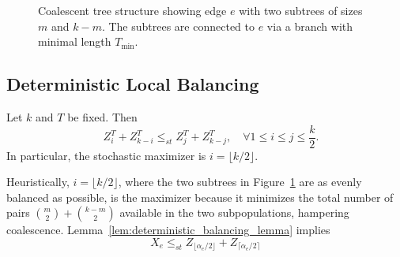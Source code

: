 \begin{figure}[t!]
\centering
{}
\caption{Coalescent tree structure showing edge $e$ with two subtrees of sizes $m$ and $k-m$. The subtrees are connected to $e$ via a branch with minimal length $T_{\mathrm{min}}$.}
\label{fig:coalescent_tree}
\end{figure}


\subsection{Deterministic Local Balancing}
\label{sec:deterministic-local-balancing}

\begin{lemma}
\label{lem:deterministic_balancing_lemma} Let $k$ and $T$ be fixed. Then
    \[\quad Z^T_{i} + Z^T_{k-i} \leq_{st}  Z^T_{j} + Z^T_{k-j}, \quad\forall 1 \leq i \leq j \leq \frac{k}{2}.\]
    \noindent In particular, the stochastic maximizer is $i = \lfloor k/2\rfloor$.
\end{lemma}

Heuristically, $i = \lfloor k/2 \rfloor$, where the two subtrees in Figure~\ref{fig:coalescent_tree} are as evenly
balanced as possible, is the maximizer because it minimizes the total number of pairs $\binom{m}{2} + \binom{k-m}{2}$
available in the two subpopulations, hampering coalescence. Lemma~\ref{lem:deterministic_balancing_lemma} implies
%
\begin{equation}
    X_e \leq_{st}  Z_{\lfloor \alpha_e/2 \rfloor} + Z_{\lceil \alpha_e/2 \rceil}
    \label{eqn:local-balancing-Xe-upper-bound}
\end{equation}

